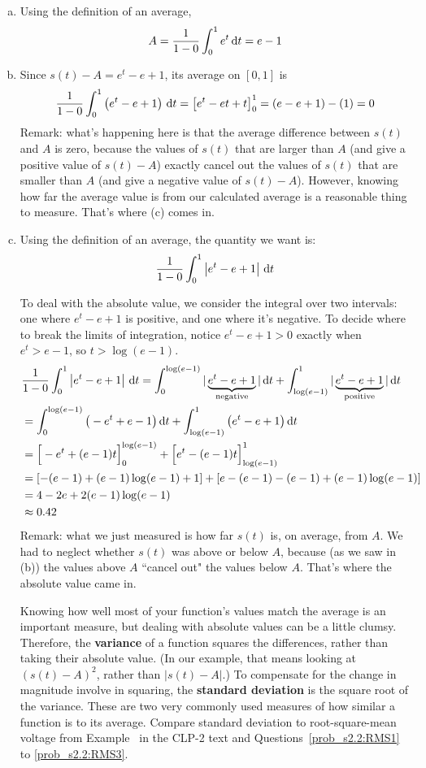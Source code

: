 \begin{solution}
\begin{enumerate}[(a)]
\item Using the definition of an average,
\[A=\frac{1}{1-0}\int_0^1 e^t\,\mathrm{d}t = e-1\]
\item Since $s(t)-A = e^t-e+1$, its average on $[0,1]$ is
\[\frac{1}{1-0}\int_0^1 \left(e^t-e+1\right)\,\mathrm{d}t = \left[e^t -et+t\right]_0^1 = (e-e+1)-(1)=0\]
Remark: what's happening here is that the average difference between $s(t)$ and $A$ is zero, because the values of $s(t)$ that are larger than $A$ (and give a positive value of $s(t)-A$) exactly cancel out the values of $s(t)$ that are smaller than $A$ (and give a negative value of $s(t)-A$). However, knowing how far the average value is from our calculated average is a reasonable thing to measure. That's where (c) comes in.
\item Using the definition of an average, the quantity we want is:
\[\frac{1}{1-0}\int_0^1\left| e^t-e+1\right|\,\mathrm{d}t\]

To deal with the absolute value, we consider the integral over two intervals: one where $e^t-e+1$ is positive, and one where it's negative. To decide where to break the limits of integration, notice $e^t-e+1>0$ exactly when $e^t>e-1$, so $t>\log(e-1)$.
\begin{align*}
&\frac{1}{1-0}\int_0^1\left| e^t-e+1\right|\,\mathrm{d}t=\int_0^{\log(e-1)}|\underbrace{e^t-e+1}_{\text{negative}}|\,\mathrm{d}t+\int_{\log(e-1)}^1|\underbrace{e^t-e+1}_{\text{positive}}|\,\mathrm{d}t\\
&=\int_0^{\log(e-1)}\big(-e^t+e-1\big)\,\mathrm{d}t+\int_{\log(e-1)}^1\big(e^t-e+1\big)\,\mathrm{d}t\\
&=\Big[-e^t+(e-1)t\Big]_0^{\log(e-1)}+
\Big[e^t-(e-1)t\Big]_{\log(e-1)}^1\\
&=\left[-(e-1)+(e-1)\log(e-1)+1\right]+
\left[e-(e-1)-(e-1)+(e-1)\log(e-1)\right]
\\&=4-2e+2(e-1)\log(e-1)\\
&\approx 0.42
\end{align*}
Remark: what we just measured is how far $s(t)$ is, on average, from $A$. We had to neglect whether $s(t)$ was above or below $A$, because (as we saw in (b)) the values above $A$ ``cancel out" the values below $A$. That's where the absolute value came in.

 Knowing how well most of your function's values match the average is an important measure, but dealing with absolute values can be a little clumsy. Therefore, the \textbf{variance} of a function squares the differences, rather than taking their absolute value. (In our example, that means looking at $(s(t)-A)^2$, rather than $|s(t)-A|$.) To compensate for the change in magnitude involve in squaring, the \textbf{standard deviation} is the square root of the variance. These are two very commonly used measures of how similar a function is to its average. Compare standard deviation to root-square-mean voltage from Example~ in the CLP-2 text and Questions~\ref{prob_s2.2:RMS1} to \ref{prob_s2.2:RMS3}.
\end{enumerate}
\end{solution}


